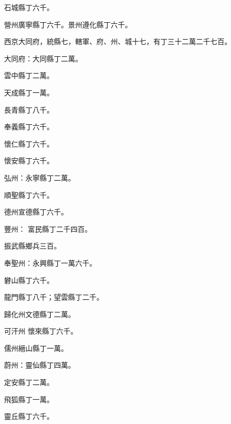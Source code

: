 \begin{pinyinscope}
 石城縣丁六千。



 營州廣寧縣丁六千。景州遵化縣丁六千。



 西京大同府，統縣七，轄軍、府、州、城十七，有丁三十二萬二千七百。



 大同府：大同縣丁二萬。



 雲中縣丁二萬。



 天成縣丁一萬。



 長青縣丁八千。



 奉義縣丁六千。



 懷仁縣丁六千。



 懷安縣丁六千。



 弘州：永寧縣丁二萬。



 順聖縣丁六千。



 德州宣德縣丁六千。



 豐州：
 富民縣丁二千四百。



 振武縣鄉兵三百。



 奉聖州：永興縣丁一萬六千。



 礬山縣丁六千。



 龍門縣丁八千；望雲縣丁二千。



 歸化州文德縣丁二萬。



 可汗州
 懷來縣丁六千。



 儒州縉山縣丁一萬。



 蔚州：靈仙縣丁四萬。



 定安縣丁二萬。



 飛狐縣丁一萬。



 靈丘縣丁六千。




\end{pinyinscope}

